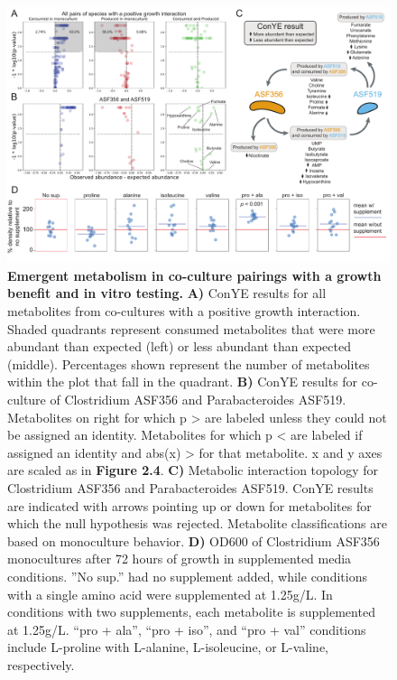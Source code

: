 \documentclass[11pt,twocolumn,notitlepage,openany,twoside]{book}
\begin{document}
\begin{refsection}
\begin{figure}[tb!]
\centering
\includegraphics[width=\textwidth]{ch2_fig6}
\caption[Emergent metabolism in co-culture pairings with a growth benefit and in vitro testing.]{\textbf{Emergent metabolism in co-culture pairings with a growth benefit and in vitro testing.} \textbf{A)} ConYE results for all metabolites from co-cultures with a positive growth interaction. Shaded quadrants represent consumed metabolites that were more abundant than expected (left) or less abundant than expected (middle). Percentages shown represent the number of metabolites within the plot that fall in the quadrant. \textbf{B)} ConYE results for co-culture of Clostridium ASF356 and Parabacteroides ASF519. Metabolites on right for which p \textgreater{} are labeled unless they could not be assigned an identity. Metabolites for which p \textless{} are labeled if assigned an identity and abs(x) \textgreater{} for that metabolite. x and y axes are scaled as in \textbf{Figure 2.4}. \textbf{C)} Metabolic interaction topology for Clostridium ASF356 and Parabacteroides ASF519. ConYE results are indicated with arrows pointing up or down for metabolites for which the null hypothesis was rejected. Metabolite classifications are based on monoculture behavior. \textbf{D)} OD600 of Clostridium ASF356 monocultures after 72 hours of growth in supplemented media conditions. ”No sup.” had no supplement added, while conditions with a single amino acid were supplemented at 1.25g/L. In conditions with two supplements, each metabolite is supplemented at 1.25g/L. “pro + ala”, “pro + iso”, and “pro + val” conditions include L-proline with L-alanine, L-isoleucine, or L-valine, respectively.}
\end{figure}


\end{refsection}
\end{document}
